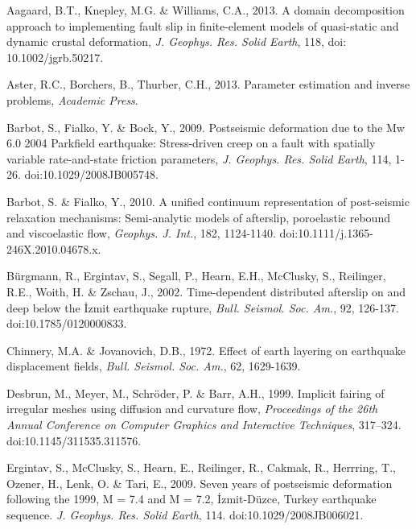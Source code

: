 \documentclass[extra]{gji}
\begin{document}
\begin{thebibliography}{}

 Aagaard, B.T., Knepley, M.G. \&
  Williams, C.A., 2013. A domain decomposition approach to
  implementing fault slip in finite-element models of quasi-static and
  dynamic crustal deformation, \textit{J. Geophys.  Res. Solid Earth},
  118, doi: 10.1002/jgrb.50217.

 Aster, R.C., Borchers, B.,
  Thurber, C.H., 2013. Parameter estimation and inverse problems,
  {\textit{Academic Press}}.

 Barbot, S., Fialko, Y. \& Bock,
  Y., 2009. Postseismic deformation due to the Mw 6.0 2004 Parkfield
  earthquake: Stress-driven creep on a fault with spatially variable
  rate-and-state friction parameters, \textit{J. Geophys. Res. Solid
  Earth}, 114, 1-26. doi:10.1029/2008JB005748.

 Barbot, S. \&
  Fialko, Y., 2010. A unified continuum representation of post-seismic
  relaxation mechanisms: Semi-analytic models of afterslip,
  poroelastic rebound and viscoelastic flow, \textit{Geophys. J.
    Int.}, 182, 1124-1140. doi:10.1111/j.1365-246X.2010.04678.x.

 B\"urgmann, R.,
  Ergintav, S., Segall, P., Hearn, E.H., McClusky, S., Reilinger,
  R.E., Woith, H. \& Zschau, J., 2002. Time-dependent distributed
  afterslip on and deep below the \.Izmit earthquake rupture,
  \textit{Bull.  Seismol. Soc. Am.}, 92,
  126-137. doi:10.1785/0120000833.

 Chinnery,
  M.A. \& Jovanovich, D.B., 1972. Effect of earth layering on
  earthquake displacement fields, \textit{Bull. Seismol.  Soc. Am.},
  62, 1629-1639.

 Desbrun, M., Meyer, M.,
  Schr\"oder, P. \& Barr, A.H., 1999.  Implicit fairing of irregular
  meshes using diffusion and curvature flow, \textit{Proceedings of
    the 26th Annual Conference on Computer Graphics and Interactive
    Techniques}, 317–324. doi:10.1145/311535.311576.

 Ergintav, S.,
  McClusky, S., Hearn, E., Reilinger, R., Cakmak, R., Herrring, T.,
  Ozener, H., Lenk, O. \& Tari, E., 2009. Seven years of postseismic
  deformation following the 1999, M = 7.4 and M = 7.2,
  \.Izmit-D\"uzce, Turkey earthquake
  sequence. \textit{J. Geophys. Res. Solid Earth},
  114. doi:10.1029/2008JB006021.


\end{thebibliography}
\end{document}
